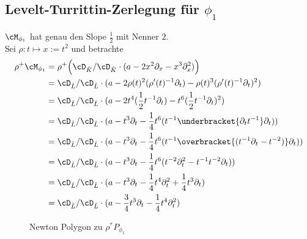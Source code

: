 \subsection{Levelt-Turrittin-Zerlegung für $\phi_1$}
\begin{comment}
Zeige zunächst: ist noch nicht zerlegt!\\
Es ist $\cM_{\phi_1}\bydef \cD_{\hat K}/\cD_{\hat K}\cdot P_{}\phi_1}$. Wäre
dieser bereits Zerlegt, also gleich einem Elementarem Meromorphen Zusammenhang,
so müsste es $\rho\in t\Cft$, $\phi\in\hat L$ und $R$ geben, so dass
$\cM_{\phi_1}\cong El(\rho,\phi,R)=\rho_+(\sE^\phi\otimes R)$.
\end{comment}
\begin{comment}
vergleiche mit \cite[Proof of theorem 5.4.7]{sabbah_cimpa90}\\
was ist $\sigma_L(P)\in \hat K[\xi]$?
\end{comment}
$\cM_{\phi_1}$ hat genau den Slope $\frac{1}{2}$ mit Nenner $2$.\\
Sei $\rho:t\mapsto x:=t^2$ und betrachte 
\begin{align*}
\rho^+\cM_{\phi_1} &= \rho^+\Big( \cD_{\hat K}/\cD_{\hat
  K}\cdot(a-2x^2\partial_x -x^3\partial_x^2) \Big) \\
&= \cD_{\hat L}/\cD_{\hat L}\cdot(a-2\rho(t)^2(\rho'(t)^{-1}\partial_t)
  -\rho(t)^3(\rho'(t)^{-1}\partial_t)^2)\\
&= \cD_{\hat L}/\cD_{\hat L}\cdot(a-2t^4(\frac{1}{2}t^{-1}\partial_t)
  -t^6(\frac{1}{2}t^{-1}\partial_t)^2)\\
&= \cD_{\hat L}/\cD_{\hat L}\cdot(a-t^3\partial_t
  -\frac{1}{4}t^6(t^{-1}\underbracket{\partial_tt^{-1}}\partial_t))\\
&= \cD_{\hat L}/\cD_{\hat L}\cdot(a-t^3\partial_t
  -\frac{1}{4}t^6(t^{-1}\overbracket{(t^{-1}\partial_t -t^{-2})}\partial_t))\\
&= \cD_{\hat L}/\cD_{\hat L}\cdot(a-t^3\partial_t
  -\frac{1}{4}t^6(t^{-2}\partial_t^2 -t^{-1}t^{-2}\partial_t))\\
&= \cD_{\hat L}/\cD_{\hat L}\cdot(a-t^3\partial_t
  -\frac{1}{4}t^4\partial_t^2+\frac{1}{4}t^{3}\partial_t)\\
&= \cD_{\hat L}/\cD_{\hat L}\cdot(a-\frac{3}{4}t^3\partial_t
  -\frac{1}{4}t^4\partial_t^2)\\
\end{align*}
\begin{figure}[H]
\caption{Newton Polygon zu $\rho^*P_{\phi_1}$}
\begin{center}
\end{center}
\end{figure}
